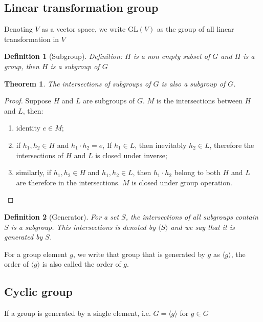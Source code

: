 \documentclass{amsart}
\newtheorem{definition}{Definition}
\newtheorem{theorem}{Theorem}
\begin{document}
\subsection*{Linear transformation group}
Denoting $V$ as a vector space, we write $\text{GL}(V)$ as the group of all linear transformation in $V$

\vspace{10pt}

\begin{definition}[Subgroup]
    Definition: $H$ is a non empty subset of $G$ and $H$ is a group, then $H$ is a subgroup of $G$
\end{definition}

\begin{theorem}
    The intersections of subgroups of $G$ is also a subgroup of $G$.
\end{theorem}
\begin{proof}
    Suppose $H$ and $L$ are subgroups of $G$. $M$ is the intersections between $H$ and $L$, then:
    \begin{enumerate}
        \item identity $e \in M$;
        \item if $h_1, h_2 \in H$ and $h_1 \cdot h_2 = e$, If $h_1\in L$, then inevitably $h_2 \in L$, therefore the intersections of $H$ and $L$ is closed under inverse;
        \item similarly, if $h_1, h_2 \in H$ and $h_1, h_2 \in L$, then $h_1\cdot h_2$ belong to both $H$ and $L$ are therefore in the intersections. $M$ is closed under group operation.
    \end{enumerate}
\end{proof}

\vspace{10pt}

\begin{definition}[Generator]
    For a set $S$, the intersections of all subgroups contain $S$ is a subgroup. This intersections is denoted by $\langle S\rangle$ and we say that it is generated by $S$. 
\end{definition}
For a group element $g$, we write that group that is generated by $g$ as $\langle g \rangle$, the order of $\langle g \rangle$ is also called the order of $g$. 

\subsection*{Cyclic group}
    If a group is generated by a single element, i.e. $G = \langle g \rangle$ for $g \in G$
\end{document}
